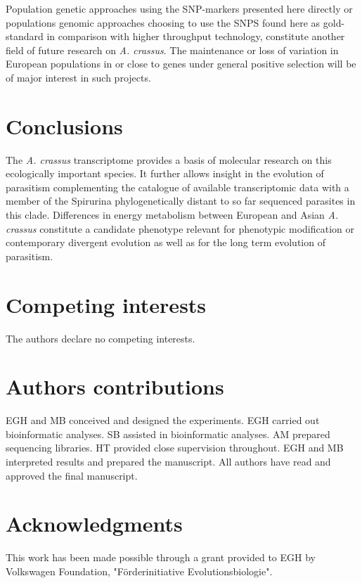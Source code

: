 \documentclass[10pt]{bmc_article}
\newenvironment{bmcformat}{\begin{raggedright}\baselineskip20pt\sloppy\setboolean{publ}{false}}{\end{raggedright}\baselineskip20pt\sloppy}
\begin{document}
\begin{bmcformat}
Population genetic approaches using the SNP-markers presented here
directly or populations genomic approaches choosing to use the SNPS
found here as gold-standard in comparison with higher throughput
technology, constitute another field of future research on
\textit{A. crassus}. The maintenance or loss of variation in European
populations in or close to genes under general positive selection will
be of major interest in such projects.

\section*{Conclusions}

The \textit{A. crassus} transcriptome provides a basis of molecular
research on this ecologically important species. It further allows
insight in the evolution of parasitism complementing the catalogue of
available transcriptomic data with a member of the Spirurina
phylogenetically distant to so far sequenced parasites in this clade.
Differences in energy metabolism between European and Asian
\textit{A. crassus} constitute a candidate phenotype relevant for
phenotypic modification or contemporary divergent evolution as well as
for the long term evolution of parasitism.

\section*{Competing interests}
The authors declare no competing interests.

\section*{Authors contributions}

EGH and MB conceived and designed the experiments. EGH carried out
bioinformatic analyses. SB assisted in bioinformatic analyses. AM
prepared sequencing libraries. HT provided close supervision
throughout. EGH and MB interpreted results and prepared the
manuscript. All authors have read and approved the final manuscript.

\section*{Acknowledgments}

This work has been made possible through a grant provided to EGH by
Volkswagen Foundation, "F\"{o}rderinitiative Evolutionsbiologie".
 

\end{bmcformat}
\end{document}
